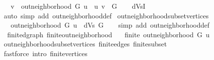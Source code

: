 \begin{isabellebody}
\ \ \ {\isachardoublequoteopen}v\ {\isasymin}\ out{\isacharunderscore}{\kern0pt}neighborhood\ G\ u\ {\isasymlongleftrightarrow}\ {\isacharparenleft}{\kern0pt}u{\isacharcomma}{\kern0pt}\ v{\isacharparenright}{\kern0pt}\ {\isasymin}\ G{\isachardoublequoteclose}%
\endisataginvisible
{\isafoldinvisible}%
%
\isadeliminvisible
\isanewline
%
\endisadeliminvisible
%
\isadelimproof
\ \ %
\endisadelimproof
%
\isatagproof
{}\isamarkupfalse%
\ dVsI{\isacharparenleft}{\kern0pt}{}{\isacharparenright}{\kern0pt}\isanewline
\ \ \isamarkupfalse%
\ {\isacharparenleft}{\kern0pt}auto\ simp\ add{\isacharcolon}{\kern0pt}\ out{\isacharunderscore}{\kern0pt}neighborhood{\isacharunderscore}{\kern0pt}def{\isacharparenright}{\kern0pt}%
\endisatagproof
{\isafoldproof}%
%
\isadelimproof
\isanewline
%
\endisadelimproof
%
\isadeliminvisible
\isanewline
%
\endisadeliminvisible
%
\isataginvisible
{}\isamarkupfalse%
\ out{\isacharunderscore}{\kern0pt}neighborhood{\isacharunderscore}{\kern0pt}subset{\isacharunderscore}{\kern0pt}vertices{\isacharcolon}{\kern0pt}\isanewline
\ \ \ {\isachardoublequoteopen}out{\isacharunderscore}{\kern0pt}neighborhood\ G\ u\ {\isasymsubseteq}\ dVs\ G{\isachardoublequoteclose}%
\endisataginvisible
{\isafoldinvisible}%
%
\isadeliminvisible
\isanewline
%
\endisadeliminvisible
%
\isadelimproof
\ \ %
\endisadelimproof
%
\isatagproof
{}\isamarkupfalse%
\ {\isacharparenleft}{\kern0pt}simp\ add{\isacharcolon}{\kern0pt}\ out{\isacharunderscore}{\kern0pt}neighborhood{\isacharunderscore}{\kern0pt}def{\isacharparenright}{\kern0pt}%
\endisatagproof
{\isafoldproof}%
%
\isadelimproof
\isanewline
%
\endisadelimproof
%
\isadeliminvisible
\isanewline
%
\endisadeliminvisible
%
\isataginvisible
{}\isamarkupfalse%
\ {\isacharparenleft}{\kern0pt}\ finite{\isacharunderscore}{\kern0pt}dgraph{\isacharparenright}{\kern0pt}\ finite{\isacharunderscore}{\kern0pt}out{\isacharunderscore}{\kern0pt}neighborhood{\isacharcolon}{\kern0pt}\isanewline
\ \ \ {\isachardoublequoteopen}finite\ {\isacharparenleft}{\kern0pt}out{\isacharunderscore}{\kern0pt}neighborhood\ G\ u{\isacharparenright}{\kern0pt}{\isachardoublequoteclose}%
\endisataginvisible
{\isafoldinvisible}%
%
\isadeliminvisible
\isanewline
%
\endisadeliminvisible
%
\isadelimproof
\ \ %
\endisadelimproof
%
\isatagproof
{}\isamarkupfalse%
\ out{\isacharunderscore}{\kern0pt}neighborhood{\isacharunderscore}{\kern0pt}subset{\isacharunderscore}{\kern0pt}vertices\ finite{\isacharunderscore}{\kern0pt}edges\ finite{\isacharunderscore}{\kern0pt}subset\isanewline
\ \ \isamarkupfalse%
\ {\isacharparenleft}{\kern0pt}fastforce\ intro{\isacharcolon}{\kern0pt}\ finite{\isacharunderscore}{\kern0pt}vertices{\isacharparenright}{\kern0pt}%
\endisatagproof
{\isafoldproof}%
%
\isadelimproof
\isanewline
%
\endisadelimproof
%
\isadelimtheory
\isanewline
%
\endisadelimtheory
%
\isatagtheory
{}\isamarkupfalse%
%
\endisatagtheory
{\isafoldtheory}%
%
\isadelimtheory
%
\endisadelimtheory
%
\end{isabellebody}%
